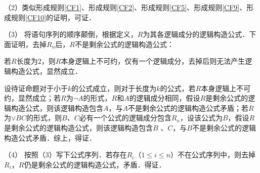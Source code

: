 \documentclass[12pt, a4paper, oneside]{book}
\begin{document}
			\par
			（2）类似形成规则\ref{CF1}、形成规则\ref{CF2}、形成规则\ref{CF5}、形成规则\ref{CF9}、形成规则\ref{CF10}的证明，可证．
			\par
			（3）	将语句序列的顺序颠倒，根据定义，$R$为其各逻辑成分的逻辑构造公式．下面证明，去掉$R_n$后，$R$不是剩余公式的逻辑构造公式：
			\par
			若$R$长度为$2$，则$R$本身逻辑上不可约，仅有一个逻辑成分，去掉后则无法产生逻辑构造公式，显然成立．
			\par
			设待证命题对于小于$k$的公式成立，则对于长度为$k$的公式，若$R$本身逻辑上不可约，显然成立；若$R$为$\neg A$的形式，$R$和$A$的逻辑成分相同，假设$R$是剩余公式的逻辑构造公式，则该逻辑构造包含$A$，与$A$不是剩余公式的逻辑构造公式矛盾；若$R$为$\lor BC$的形式，则$B$、$C$必有一个公式的逻辑成分包含$R_n$，设该公式为$B$，假设$R$是剩余公式的逻辑构造公式，则该逻辑构造包含$B$ 、$C$，与$B$不是剩余公式的逻辑构造公式矛盾．综上，得证．
			\par
			（4）	按照（3）写下公式序列．若存在$R_i$（$1\leq i\leq n$）不在公式序列中，则去掉$R_i$，$R$仍是剩余公式的逻辑构造公式，矛盾．得证．
			
\end{document}

